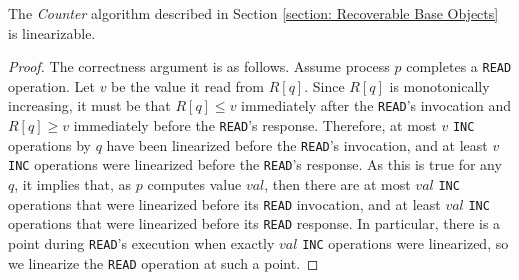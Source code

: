 \begin{claim}
The \textit{Counter} algorithm described in Section \ref{section: Recoverable Base Objects} is linearizable.
\end{claim}

\begin{proof}
The correctness argument is as follows. Assume process $p$ completes a \texttt{READ} operation. Let $v$ be the value it read from $R[q]$. Since $R[q]$ is monotonically increasing, it must be that $R[q] \leq v$ immediately after the \texttt{READ}'s invocation and $R[q] \geq v$ immediately before the \texttt{READ}'s response. Therefore, at most $v$ \texttt{INC} operations by $q$ have been linearized before the \texttt{READ}'s invocation, and at least $v$ \texttt{INC} operations were linearized before the \texttt{READ}'s response. As this is true for any $q$, it implies that, as $p$ computes value $val$, then there are at most $val$ \texttt{INC} operations that were linearized before its \texttt{READ} invocation, and at least $val$ \texttt{INC} operations that were linearized before its \texttt{READ} response. In particular, there is a point during \texttt{READ}'s execution when exactly $val$ \texttt{INC} operations were linearized, so we linearize the \texttt{READ} operation at such a point.
\end{proof} 